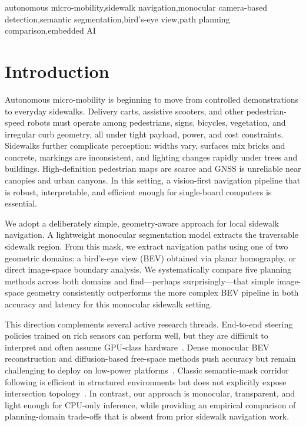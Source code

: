 \documentclass[a4paper,fleqn,10pt]{cas-dc}
\begin{document}
\begin{keywords}
autonomous micro-mobility\sep sidewalk navigation\sep monocular camera-based detection\sep semantic segmentation\sep bird's-eye view\sep path planning comparison\sep embedded AI
\end{keywords}



\maketitle{}

\section{Introduction}
Autonomous micro-mobility is beginning to move from controlled demonstrations to everyday sidewalks. Delivery carts, assistive scooters, and other pedestrian-speed robots must operate among pedestrians, signs, bicycles, vegetation, and irregular curb geometry, all under tight payload, power, and cost constraints. Sidewalks further complicate perception: widths vary, surfaces mix bricks and concrete, markings are inconsistent, and lighting changes rapidly under trees and buildings. High-definition pedestrian maps are scarce and GNSS is unreliable near canopies and urban canyons. In this setting, a vision-first navigation pipeline that is robust, interpretable, and efficient enough for single-board computers is essential.

We adopt a deliberately simple, geometry-aware approach for local sidewalk navigation. A lightweight monocular segmentation model extracts the traversable sidewalk region. From this mask, we extract navigation paths using one of two geometric domains: a bird's-eye view (BEV) obtained via planar homography, or direct image-space boundary analysis. We systematically compare five planning methods across both domains and find---perhaps surprisingly---that simple image-space geometry consistently outperforms the more complex BEV pipeline in both accuracy and latency for this monocular sidewalk setting.

This direction complements several active research threads. End-to-end steering policies trained on rich sensors can perform well, but they are difficult to interpret and often assume GPU-class hardware~\cite{e2e_nav_policies, viteri2024}. Dense monocular BEV reconstruction and diffusion-based free-space methods push accuracy but remain challenging to deploy on low-power platforms~\cite{zhao2024bev, gupta2025diffusion}. Classic semantic-mask corridor following is efficient in structured environments but does not explicitly expose intersection topology~\cite{orchard_seg_nav, row_nav_survey}. In contrast, our approach is monocular, transparent, and light enough for CPU-only inference, while providing an empirical comparison of planning-domain trade-offs that is absent from prior sidewalk navigation work.
\end{document}
